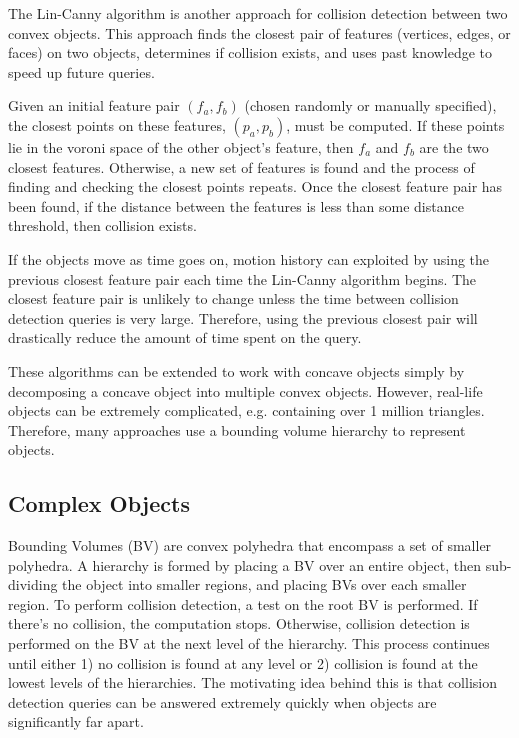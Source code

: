 \documentclass[10pt,conference]{ieeeconf}
\begin{document}
	The Lin-Canny algorithm \cite{lin1991fast} is another approach for collision detection between two convex objects. This approach finds the closest pair of features (vertices, edges, or faces) on two objects, determines if collision exists, and uses past knowledge to speed up future queries. 
	
	Given an initial feature pair $(f_a, f_b)$ (chosen randomly or manually specified), the closest points on these features, $(p_a, p_b)$, must be computed. If these points lie in the voroni space of the other object's feature, then $f_a$ and $f_b$ are the two closest features. Otherwise, a new set of features is found and the process of finding and checking the closest points repeats. Once the closest feature pair has been found, if the distance between the features is less than some distance threshold, then collision exists.
	
	If the objects move as time goes on, motion history can exploited by using the previous closest feature pair each time the Lin-Canny algorithm begins. The closest feature pair is unlikely to change unless the time between collision detection queries is very large. Therefore, using the previous closest pair will drastically reduce the amount of time spent on the query. 
	
	These algorithms can be extended to work with concave objects simply by decomposing a concave object into multiple convex objects. However, real-life objects can be extremely complicated, e.g. containing over 1 million triangles. Therefore, many approaches use a bounding volume hierarchy to represent objects.
	
\subsection{Complex Objects}

	Bounding Volumes (BV) are convex polyhedra	that encompass a set of smaller polyhedra. A hierarchy is formed by placing a BV over an entire object, then sub-dividing the object into smaller regions, and placing BVs over each smaller region. To perform collision detection, a test on the root BV is performed. If there's no collision, the computation stops. Otherwise, collision detection is performed on the BV at the next level of the hierarchy. This process continues until either 1) no collision is found at any level or 2) collision is found at the lowest levels of the hierarchies. The motivating idea behind this is that collision detection queries can be answered extremely quickly when objects are significantly far apart. 
	
\end{document}
